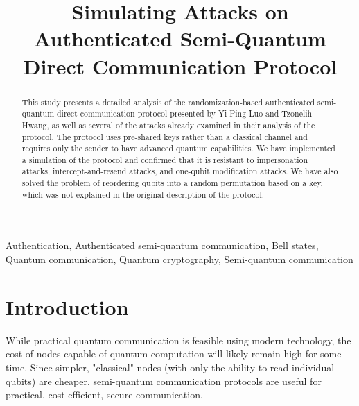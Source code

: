 \documentclass[conference,compsoc]{IEEEtran}
\begin{document}
\title{Simulating Attacks on Authenticated Semi-Quantum Direct Communication Protocol}

\author{
\and
{}
}

\maketitle

\begin{abstract}

This study presents a detailed analysis of the randomization-based authenticated semi-quantum direct
communication protocol presented by Yi-Ping Luo and Tzonelih Hwang, as well as several of the attacks
already examined in their analysis of the protocol. The protocol uses pre-shared keys
rather than a classical channel and requires only the sender to have advanced quantum capabilities.
We have implemented a simulation of the protocol and confirmed that it is resistant to impersonation
attacks, intercept-and-resend attacks, and one-qubit modification attacks. We have also solved
the problem of reordering qubits into a random permutation based on a key,
which was not explained in the original description of the protocol.

\end{abstract}

\begin{IEEEkeywords}

Authentication,
Authenticated semi-quantum communication,
Bell states,
Quantum communication,
Quantum cryptography,
Semi-quantum communication

\end{IEEEkeywords}

\section{Introduction}

While practical quantum communication is feasible using
modern technology, the cost of nodes capable of quantum computation
will likely remain high for some time. Since simpler, "classical" nodes
(with only the ability to read individual qubits) are cheaper,
semi-quantum communication protocols are useful for practical,
cost-efficient, secure communication.
\end{document}
